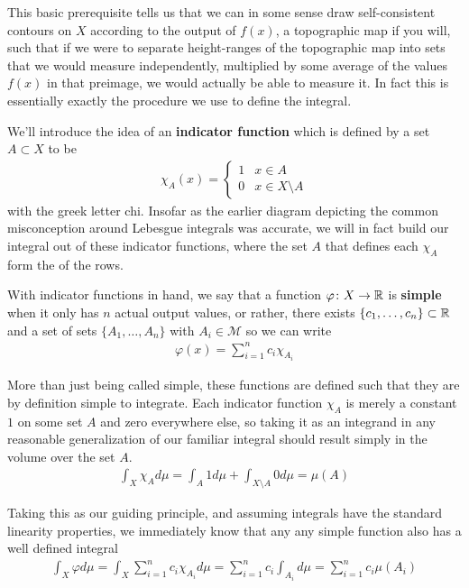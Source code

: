 \documentclass[11pt]{article}
\begin{document}
This basic prerequisite tells us that we can in some sense draw self-consistent contours on $X$ according to the output of $f(x)$, a topographic map if you will, such that if we were to separate height-ranges of the topographic map into sets that we would measure independently, multiplied by some average of the values $f(x)$ in that preimage, we would actually be able to measure it. In fact this is essentially exactly the procedure we use to define the integral.

We'll introduce the idea of an \textbf{indicator function} which is defined by a set $A \subset X$ to be \begin{gather*}
\chi_A (x) = \left\{ \begin{matrix} 1 & x \in A \\ 0 & x\in X \setminus A \end{matrix} \right.
\end{gather*}
with the greek letter chi. Insofar as the earlier diagram depicting the common misconception around Lebesgue integrals was accurate, we will in fact build our integral out of these indicator functions, where the set $A$ that defines each $\chi_A$ form the  of the rows.

With indicator functions in hand, we say that a function $\varphi \colon X \to \mathbb{R}$ is \textbf{simple} when it only has $n$ actual output values, or rather, there exists $\{c_1,\dots, c_n\} \subset \mathbb{R}$ and a set of sets $\{A_1,\dots, A_n\}$ with $A_i \in \mathcal M$ so we can write \begin{gather*}
\varphi(x) = \sum_{i = 1}^n c_i \chi_{A_i}
\end{gather*}

More than just being called simple, these functions are defined such that they are by definition simple to integrate. Each indicator function $\chi_A$ is merely a constant $1$ on some set $A$ and zero everywhere else, so taking it as an integrand in any reasonable generalization of our familiar integral should result simply in the volume over the set $A$. \begin{gather*}
\int_X \chi_A d\mu = \int_A 1 d\mu + \int_{X \setminus A} 0 d\mu = \mu(A)
\end{gather*}

Taking this as our guiding principle, and assuming integrals have the standard linearity properties, we immediately know that any any simple function also has a well defined integral \begin{gather*}
\int_X \varphi d\mu = \int_X \sum_{i=1}^n c_i \chi_{A_i} d\mu = \sum_{i=1}^n c_i\int_{A_i} d\mu = \sum_{i=1}^n c_i \mu(A_i)
\end{gather*}
\end{document}
